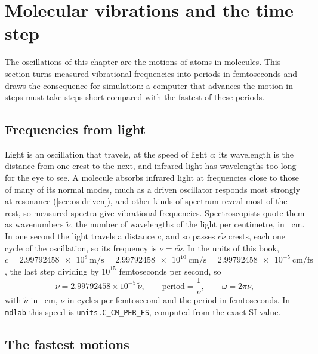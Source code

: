 \section{Molecular vibrations and the time step}
\label{sec:os-molecules}

The oscillations of this chapter are the motions of atoms in molecules.
This section turns measured vibrational frequencies into periods in
femtoseconds and draws the consequence for simulation: a computer that
advances the motion in steps must take steps short compared with the
fastest of these periods.

\subsection*{Frequencies from light}

Light is an oscillation that travels, at the speed of light $c$; its
wavelength is the distance from one crest to the next, and infrared light
has wavelengths too long for the eye to see. A molecule absorbs infrared
light at frequencies close to those of many of its normal modes, much as
a driven oscillator responds most strongly at resonance
(\cref{sec:os-driven}), and other kinds of spectrum reveal most of the
rest, so measured spectra give vibrational frequencies. Spectroscopists
quote them as wavenumbers $\tilde\nu$, the number of wavelengths of the
light per centimetre, in \si{\per\centi\metre}. In one second the light
travels a distance $c$, and so passes $c\tilde\nu$ crests, each one cycle
of the oscillation, so its frequency is $\nu = c\tilde\nu$. In the units of this book, $c =
\SI{2.99792458e8}{\metre\per\second} = \SI{2.99792458e10}{\centi\metre\per
\second} = \SI{2.99792458e-5}{\centi\metre\per\femto\second}$, the last
step dividing by $10^{15}$ femtoseconds per second, so
\begin{equation*}
   \nu = 2.99792458\times10^{-5}\,\tilde\nu ,
   \qquad
   \text{period} = \frac1\nu , \qquad \omega = 2\pi\nu ,
\end{equation*}
with $\tilde\nu$ in \si{\per\centi\metre}, $\nu$ in cycles per
femtosecond and the period in femtoseconds. In \texttt{mdlab} this speed is
\texttt{units.C\_CM\_PER\_FS}, computed from the exact SI value.

\subsection*{The fastest motions}


